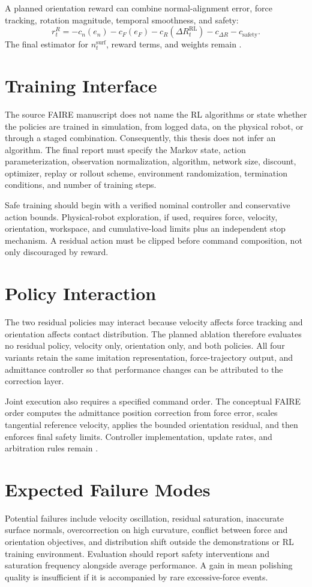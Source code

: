 A planned orientation reward can combine normal-alignment error, force tracking, rotation magnitude, temporal smoothness, and safety:
\begin{equation}
  r_t^R =
  -c_n(e_n)
  -c_F(e_F)
  -c_R(\Delta R_t^{\mathrm{RL}})
  -c_{\Delta R}
  -c_{\mathrm{safety}}.
  \label{eq:orientation_reward}
\end{equation}
The final estimator for \(n_t^{\mathrm{surf}}\), reward terms, and weights remain .

\section{Training Interface}
The source FAIRE manuscript does not name the RL algorithms or state whether the policies are trained in simulation, from logged data, on the physical robot, or through a staged combination. Consequently, this thesis does not infer an algorithm. The final report must specify the Markov state, action parameterization, observation normalization, algorithm, network size, discount, optimizer, replay or rollout scheme, environment randomization, termination conditions, and number of training steps.

Safe training should begin with a verified nominal controller and conservative action bounds. Physical-robot exploration, if used, requires force, velocity, orientation, workspace, and cumulative-load limits plus an independent stop mechanism. A residual action must be clipped before command composition, not only discouraged by reward.

\section{Policy Interaction}
The two residual policies may interact because velocity affects force tracking and orientation affects contact distribution. The planned ablation therefore evaluates no residual policy, velocity only, orientation only, and both policies. All four variants retain the same imitation representation, force-trajectory output, and admittance controller so that performance changes can be attributed to the correction layer.

Joint execution also requires a specified command order. The conceptual FAIRE order computes the admittance position correction from force error, scales tangential reference velocity, applies the bounded orientation residual, and then enforces final safety limits. Controller implementation, update rates, and arbitration rules remain .

\section{Expected Failure Modes}
Potential failures include velocity oscillation, residual saturation, inaccurate surface normals, overcorrection on high curvature, conflict between force and orientation objectives, and distribution shift outside the demonstrations or RL training environment. Evaluation should report safety interventions and saturation frequency alongside average performance. A gain in mean polishing quality is insufficient if it is accompanied by rare excessive-force events.
